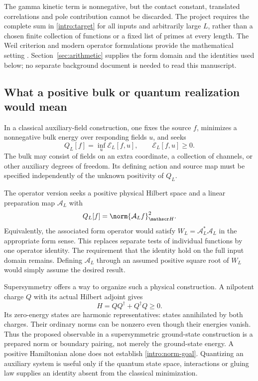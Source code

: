 The gamma kinetic term is nonnegative, but the contact constant, translated correlations and pole contribution cannot be discarded. The project requires the complete sum in \eqref{intro:target} for all inputs and arbitrarily large $L$, rather than a chosen finite collection of functions or a fixed list of primes at every length. The Weil criterion and modern operator formulations provide the mathematical setting \cite{Suzuki}. Section~\ref{sec:arithmetic} supplies the form domain and the identities used below; no separate background document is needed to read this manuscript.

\subsection{What a positive bulk or quantum realization would mean}
In a classical auxiliary-field construction, one fixes the source $f$, minimizes a nonnegative bulk energy over responding fields $u$, and seeks
\begin{equation}\label{intro:bulk-goal}
Q_L[f]=\inf_u\mathcal E_L[f,u],\qquad \mathcal E_L[f,u]\ge0.
\end{equation}
The bulk may consist of fields on an extra coordinate, a collection of channels, or other auxiliary degrees of freedom. Its defining action and source map must be specified independently of the unknown positivity of $Q_L$.

The operator version seeks a positive physical Hilbert space and a linear preparation map $\mathcal A_L$ with
\begin{equation}\label{intro:norm-goal}
Q_L[f]=\norm{\mathcal A_Lf}_{\mathscr H}^2.
\end{equation}
Equivalently, the associated form operator would satisfy $W_L=\mathcal A_L^*\mathcal A_L$ in the appropriate form sense. This replaces separate tests of individual functions by one operator identity. The requirement that the identity hold on the full input domain remains. Defining $\mathcal A_L$ through an assumed positive square root of $W_L$ would simply assume the desired result.

Supersymmetry offers a way to organize such a physical construction. A nilpotent charge $Q$ with its actual Hilbert adjoint gives
\[
H=QQ^\dagger+Q^\dagger Q\ge0.
\]
Its zero-energy states are harmonic representatives: states annihilated by both charges. Their ordinary norms can be nonzero even though their energies vanish. Thus the proposed observable in a supersymmetric ground-state construction is a prepared norm or boundary pairing, not merely the ground-state energy. A positive Hamiltonian alone does not establish \eqref{intro:norm-goal}. Quantizing an auxiliary system is useful only if the quantum state space, interactions or gluing law supplies an identity absent from the classical minimization.

